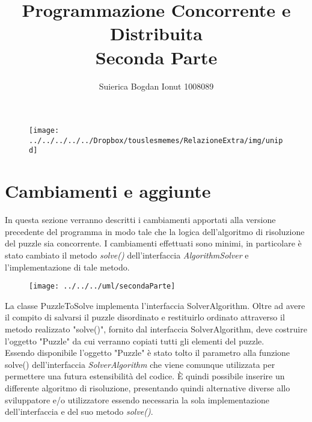 \documentclass[13pt]{article}
\title{Programmazione Concorrente e Distribuita\\Seconda Parte}
\author{Suierica Bogdan Ionut 1008089}
\begin{document}
\maketitle

\begin{figure}[h]
\centering
\texttt{[image: ../../../../../Dropbox/touslesmemes/RelazioneExtra/img/unipd]}
\label{fig:unipd}
\end{figure}

\newpage
\section{Cambiamenti e aggiunte}
In questa sezione verranno descritti i cambiamenti apportati alla versione precedente del programma in modo tale che la logica dell'algoritmo di risoluzione del puzzle sia concorrente. I cambiamenti effettuati sono minimi, in particolare è stato cambiato il metodo \textit{solve()} dell'interfaccia \textit{AlgorithmSolver} e l'implementazione di tale metodo.
\begin{figure}[h]
\centering
\texttt{[image: ../../../uml/secondaParte]}
\label{fig:secondaParte}
\end{figure}

La classe PuzzleToSolve implementa l'interfaccia SolverAlgorithm. Oltre ad avere il compito di salvarsi il puzzle disordinato e restituirlo ordinato attraverso il metodo realizzato "solve()", fornito dal interfaccia SolverAlgorithm, deve costruire l'oggetto "Puzzle" da cui verranno copiati tutti gli elementi del puzzle.
\\
Essendo disponibile l'oggetto "Puzzle" è stato tolto il parametro alla funzione solve() dell'interfaccia \textit{SolverAlgorithm} che viene comunque utilizzata per permettere una futura estensibilità del codice. È quindi possibile inserire un differente algoritmo di risoluzione, presentando quindi alternative diverse allo sviluppatore e/o utilizzatore essendo necessaria la sola implementazione dell'interfaccia e del suo metodo \textit{solve()}.

\newpage
\end{document}
